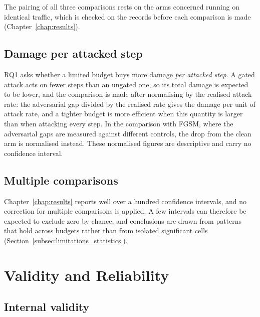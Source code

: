 The pairing of all three comparisons rests on the arms concerned running on identical
traffic, which is checked on the records before each comparison is made
(Chapter~\ref{chap:results}).

\subsection{Damage per attacked step}
\label{subsec:analysis_efficiency}

RQ1 asks whether a limited budget buys more damage \emph{per attacked step}. A gated
attack acts on fewer steps than an ungated one, so its total damage is expected to be
lower, and the comparison is made after normalising by the realised attack rate: the
adversarial gap divided by the realised rate gives the damage per unit of attack rate,
and a tighter budget is more efficient when this quantity is larger than when attacking
every step. In the comparison with FGSM, where the adversarial gaps are measured against
different controls, the drop from the clean arm is normalised instead. These normalised
figures are descriptive and carry no confidence interval.

\subsection{Multiple comparisons}
\label{subsec:analysis_multiplicity}

Chapter~\ref{chap:results} reports well over a hundred confidence intervals, and no
correction for multiple comparisons is applied. A few intervals can therefore be
expected to exclude zero by chance, and conclusions are drawn from patterns that hold
across budgets rather than from isolated significant cells
(Section~\ref{subsec:limitations_statistics}).

\section{Validity and Reliability}
\label{sec:validity}

\subsection{Internal validity}
\label{subsec:validity_internal}

